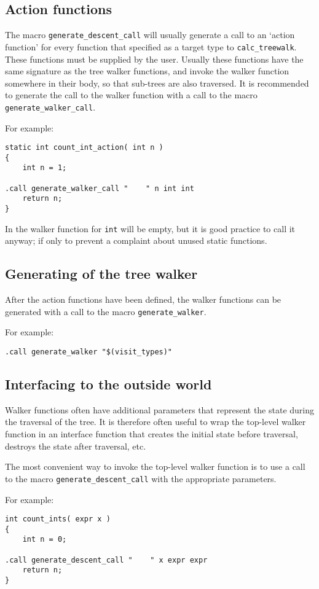 \subsection{Action functions}
The macro \verb'generate_descent_call' will usually generate a call to
an `action function' for every function that specified as a target type
to \verb'calc_treewalk'. These functions must be supplied by the user.
Usually these functions have the same signature as the tree walker
functions, and invoke the walker function somewhere in their body, so that
sub-trees are also traversed. It is recommended to generate the call
to the walker function with a call to the macro \verb'generate_walker_call'.
\par
For example:
\begin{verbatim}
static int count_int_action( int n )
{
    int n = 1;

.call generate_walker_call "    " n int int
    return n;
}
\end{verbatim}
In the walker function for {\tt int} will be empty, but it is good
practice to call it anyway; if only to prevent a complaint about
unused static functions.
\subsection{Generating of the tree walker}
After the action functions have been defined, the walker functions can
be generated with a call to the macro \verb'generate_walker'.
\par
For example:
\begin{verbatim}
.call generate_walker "$(visit_types)"
\end{verbatim}
\subsection{Interfacing to the outside world}
Walker functions often have additional parameters that represent
the state during the traversal of the tree. It is therefore often
useful to wrap the top-level walker function in an interface function
that creates the initial state before traversal, destroys the state
after traversal, etc. 
\par
The most convenient way to invoke the top-level walker function is to
use a call to the macro \verb'generate_descent_call' with the appropriate
parameters.
\par
For example:
\begin{verbatim}
int count_ints( expr x )
{
    int n = 0;

.call generate_descent_call "    " x expr expr
    return n;
}
\end{verbatim}
